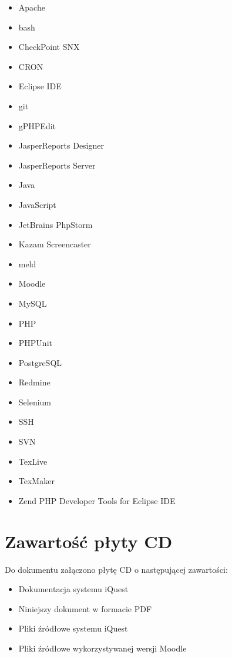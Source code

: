 \begin{itemize}
\item Apache
\item bash
\item CheckPoint SNX
\item CRON
\item Eclipse IDE
\item git
\item gPHPEdit
\item JasperReports Designer
\item JasperReports Server
\item Java
\item JavaScript
\item JetBrains PhpStorm
\item Kazam Screencaster
\item meld
\item Moodle
\item MySQL
\item PHP
\item PHPUnit
\item PostgreSQL
\item Redmine
\item Selenium
\item SSH
\item SVN
\item TexLive
\item TexMaker
\item Zend PHP Developer Tools for Eclipse IDE
\end{itemize}

\section{Zawartość płyty CD}

Do dokumentu załączono płytę CD o następującej zawartości:

\begin{itemize}
\item Dokumentacja systemu iQuest
\item Niniejszy dokument w formacie PDF
\item Pliki źródłowe systemu iQuest
\item Pliki źródłowe wykorzystywanej wersji Moodle
\end{itemize}